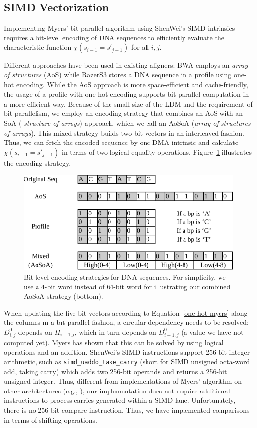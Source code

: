 \documentclass[conference]{IEEEtran}
\begin{document}
\subsection{SIMD Vectorization}

Implementing Myers' bit-parallel algorithm using ShenWei's SIMD
intrinsics requires a bit-level encoding of DNA sequences to
efficiently evaluate the characteristic function $\chi(s_{i-1} =
s'_{j-1})$ for all $i, j$.

Different approaches have been used in existing aligners: BWA
\cite{bwa} employs an {\em array of structures} (AoS) while RazerS3
\cite{razers3} stores a DNA sequence in a profile using one-hot
encoding. While the AoS approach is more space-efficient and
cache-friendly, the usage of a profile with one-hot encoding supports
bit-parallel computation in a more efficient way.  Because of the
small size of the LDM and the requirement of bit parallelism, we
employ an encoding strategy that combines an AoS with an SoA ({\em
  structure of arrays}) approach, which we call an AoSoA ({\em array
  of structures of arrays}). This mixed strategy builds two
bit-vectors in an interleaved fashion. Thus, we can fetch the encoded
sequence by one DMA-intrinsic and calculate $\chi(s_{i-1} = s'_{j-1})$
in terms of two logical equality operations. Figure~\ref{MixPack}
illustrates the encoding strategy.

\begin{figure}[!htb]
  \includegraphics[width=0.9\linewidth]{figures/MixPack}
  \caption{Bit-level encoding strategies for DNA sequences. For
    simplicity, we use a 4-bit word instead of 64-bit word for
    illustrating our combined AoSoA strategy (bottom).}
  \label{MixPack}
\end{figure}

When updating the five bit-vectors according to
Equation~\ref{one-hot-myers} along the columns in a bit-parallel
fashion, a circular dependency needs to be resolved: $D^0_{i,j}$
depends on $H^-_{i-1, j}$, which in turn depends on $D^0_{i-1,j}$ (a
value we have not computed yet). Myers \cite{myers} has shown that
this can be solved by using logical operations and an
addition. ShenWei's SIMD instructions support 256-bit integer
arithmetic, such as \texttt{simd\_uaddo\_take\_carry} (short for SIMD
unsigned octa-word add, taking carry) which adds two 256-bit operands
and returns a 256-bit unsigned integer. Thus, different from
implementations of Myers' algorithm on other architectures (e.g.,
\cite{chacon}), our implementation does not require additional
instructions to process carries generated within a SIMD
lane. Unfortunately, there is no 256-bit compare instruction. Thus, we
have implemented comparisons in terms of shifting operations.
\end{document}
